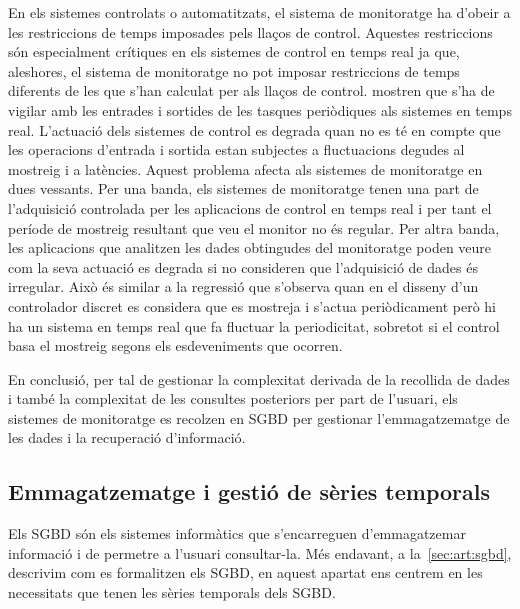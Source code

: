\begin{enumerate}
En els sistemes controlats o automatitzats, el sistema de monitoratge
ha d'obeir a les restriccions de temps imposades pels llaços de
control. Aquestes restriccions són especialment crítiques en els
sistemes de control en temps real ja que, aleshores, el sistema de
monitoratge no pot imposar restriccions de temps diferents de les que
s'han calculat per als llaços de control.  \textcite{lozoya08} mostren
que s'ha de vigilar amb les entrades i sortides de les tasques
periòdiques als sistemes en temps real. L'actuació dels sistemes de
control es degrada quan no es té en compte que les operacions
d'entrada i sortida estan subjectes a fluctuacions degudes al mostreig
i a latències. Aquest problema afecta als sistemes de monitoratge en
dues vessants.  Per una banda, els sistemes de monitoratge tenen una
part de l'adquisició controlada per les aplicacions de control en
temps real i per tant el període de mostreig resultant que veu el
monitor no és regular.
%
Per altra banda,
les aplicacions que analitzen les dades obtingudes del monitoratge
poden veure com la seva actuació es degrada si no consideren que
l'adquisició de dades és irregular. Això és similar a la regressió que
s'observa \parencite{lozoya08} quan en el disseny d'un controlador
discret es considera que es mostreja i s'actua periòdicament però hi
ha un sistema en temps real que fa fluctuar la periodicitat, sobretot
si el control basa el mostreig segons els esdeveniments que ocorren.
\end{enumerate}



En conclusió, per tal de gestionar la complexitat derivada de la
recollida de dades i també la complexitat de les consultes posteriors
per part de l'usuari, els sistemes de monitoratge es recolzen en
\gls{SGBD} per gestionar l'emmagatzematge de les dades i la
recuperació d'informació.






\subsection{Emmagatzematge i gestió de sèries temporals}


Els \gls{SGBD} són els sistemes informàtics que s'encarreguen
d'emmagatzemar informació i de permetre a l'usuari consultar-la. Més
endavant, a la~\autoref{sec:art:sgbd}, descrivim com es formalitzen els
\gls{SGBD}, en aquest apartat ens centrem en les necessitats que tenen
les sèries temporals dels \gls{SGBD}.


